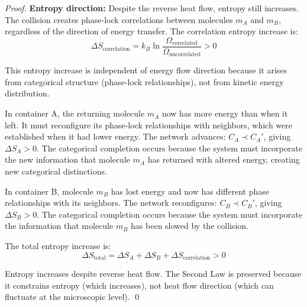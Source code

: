 \documentclass[12pt,a4paper]{article}
\theoremstyle{definition}
\theoremstyle{remark}
\begin{document}
\begin{proof}
\textbf{Entropy direction:}
Despite the reverse heat flow, entropy still increases. The collision creates phase-lock correlations between molecules $m_A$ and $m_B$, regardless of the direction of energy transfer. The correlation entropy increase is:
\begin{equation}
\Delta S_{\text{correlation}} = k_B \ln \frac{\Omega_{\text{correlated}}}{\Omega_{\text{uncorrelated}}} > 0
\end{equation}

This entropy increase is independent of energy flow direction because it arises from categorical structure (phase-lock relationships), not from kinetic energy distribution.

In container A, the returning molecule $m_A$ now has more energy than when it left. It must reconfigure its phase-lock relationships with neighbors, which were established when it had lower energy. The network advances: $C_A \prec C_A'$, giving $\Delta S_A > 0$. The categorical completion occurs because the system must incorporate the new information that molecule $m_A$ has returned with altered energy, creating new categorical distinctions.

In container B, molecule $m_B$ has lost energy and now has different phase relationships with its neighbors. The network reconfigures: $C_B \prec C_B'$, giving $\Delta S_B > 0$. The categorical completion occurs because the system must incorporate the information that molecule $m_B$ has been slowed by the collision.

The total entropy increase is:
\begin{equation}
\Delta S_{\text{total}} = \Delta S_A + \Delta S_B + \Delta S_{\text{correlation}} > 0
\end{equation}

Entropy increases despite reverse heat flow. The Second Law is preserved because it constrains entropy (which increases), not heat flow direction (which can fluctuate at the microscopic level). \qed
\end{proof}
\end{document}
